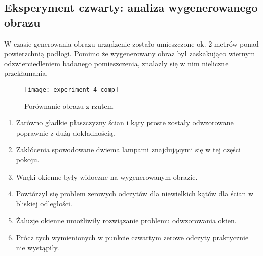 \subsection {Eksperyment czwarty: analiza wygenerowanego obrazu}
W czasie generowania obrazu urządzenie zostało umieszczone ok. 2 metrów ponad powierzchnią podłogi. Pomimo że wygenerowany obraz był zaskakująco wiernym odzwierciedleniem badanego pomieszczenia, znalazły się w nim nieliczne przekłamania.
\begin{figure}[h]
    \centering
    \texttt{[image: experiment\_4\_comp]}
    \caption{Porównanie obrazu z rzutem}
    \label{fig:experiment_4_comp}
\end{figure}
\newpage
\begin{enumerate}
    \item Zarówno gładkie płaszczyzny ścian i kąty proste zostały odwzorowane poprawnie z dużą dokładnością.
    \item Zakłócenia spowodowane dwiema lampami znajdującymi się w tej części pokoju.
    \item Wnęki okienne były widoczne na wygenerowanym obrazie.
    \item Powtórzył się problem zerowych odczytów dla niewielkich kątów dla ścian w bliskiej odległości.
    \item Żaluzje okienne umożliwiły rozwiązanie problemu odwzorowania okien.
    \item Prócz tych wymienionych w punkcie czwartym zerowe odczyty praktycznie nie wystąpiły.
\end{enumerate}
